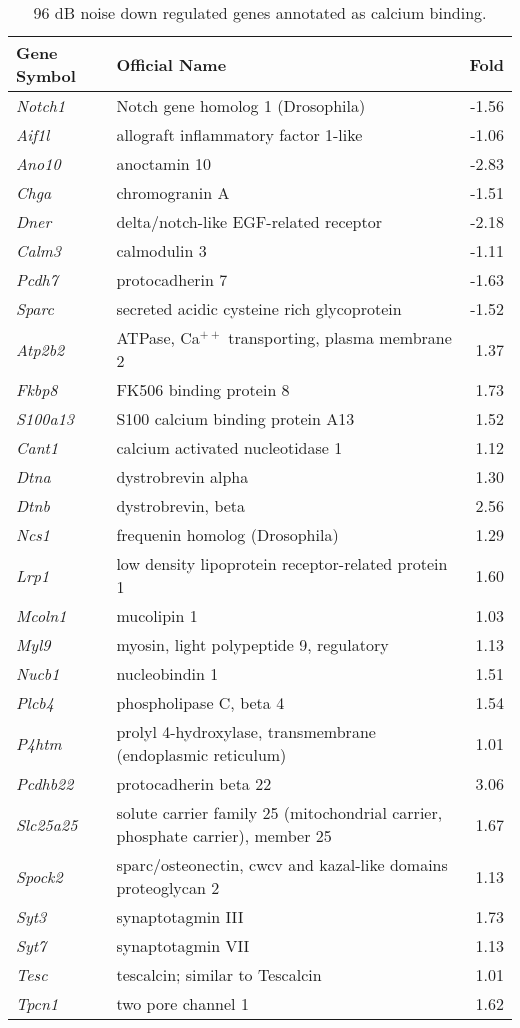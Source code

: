 \documentclass{article}
\begin{document}
\begin{table}
\caption{96 dB noise down regulated genes annotated as calcium binding.}
\begin{small}
\begin{tabular}{l p{3.5in} r}
\hline
Gene Symbol & Official Name & Fold\\
\hline
{\it Notch1} &  Notch gene homolog 1 (Drosophila)	& -1.56 \\
{\it Aif1l} &	allograft inflammatory factor 1-like & -1.06	\\
{\it Ano10} &	anoctamin 10	& -2.83\\
{\it Chga} &	chromogranin A	& -1.51 \\
{\it Dner}	& delta/notch-like EGF-related receptor	& -2.18 \\
{\it Calm3} &	calmodulin 3 & -1.11 \\
{\it Pcdh7} & 	protocadherin 7	& -1.63 \\
{\it Sparc} & 	secreted acidic cysteine rich glycoprotein & -1.52 \\
{\it Atp2b2} &  ATPase, Ca$^{++}$ transporting, plasma membrane 2	& 1.37 \\
{\it Fkbp8} &	FK506 binding protein 8	& 1.73 \\
{\it S100a13} &	S100 calcium binding protein A13 & 1.52 \\
{\it Cant1} &	calcium activated nucleotidase 1	& 1.12 \\
{\it Dtna}	& dystrobrevin alpha	& 1.30 \\
{\it Dtnb} &	dystrobrevin, beta	& 2.56 \\
{\it Ncs1} &	frequenin homolog (Drosophila)	& 1.29 \\
{\it Lrp1}	& low density lipoprotein receptor-related protein 1	& 1.60 \\
{\it Mcoln1} &	mucolipin 1	 & 1.03 \\
{\it Myl9} & 	myosin, light polypeptide 9, regulatory	& 1.13 \\
{\it Nucb1} &	nucleobindin 1	& 1.51 \\
{\it Plcb4}&	phospholipase C, beta 4	& 1.54	\\
{\it P4htm} &	prolyl 4-hydroxylase, transmembrane (endoplasmic reticulum)	& 1.01	\\
{\it Pcdhb22}	& protocadherin beta 22	& 3.06	\\
{\it Slc25a25} &	solute carrier family 25 (mitochondrial carrier, phosphate carrier), member 25	& 1.67	\\
{\it Spock2} &	sparc/osteonectin, cwcv and kazal-like domains proteoglycan 2	& 1.13	\\
{\it Syt3} &	synaptotagmin III	& 1.73	\\
{\it Syt7} &	synaptotagmin VII	& 1.13	\\
{\it Tesc} &	tescalcin; similar to Tescalcin	& 1.01	\\
{\it Tpcn1} &	two pore channel 1	& 1.62	\\
\hline
\end{tabular}
\end{small}
\label{table:tab4}
\end{table}
\end{document}
